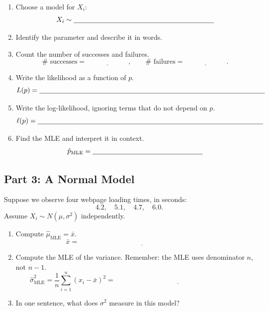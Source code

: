 \documentclass{article}
\newcommand{\blankline}[1]{\underline{\hspace{#1}}}
\begin{document}
\begin{enumerate}[label={\bfseries (\Alph*)},itemsep=.75em]
\item Choose a model for $X_i$:
\[
X_i \sim \blankline{2.8in}
\]
\item Identify the parameter and describe it in words. \\[3em]
\item Count the number of successes and failures.
\[
\#\text{ successes}=\blankline{1in}, \qquad \#\text{ failures}=\blankline{1in}.
\]
\item Write the likelihood as a function of $p$.
\[
L(p) = \blankline{4.5in}
\]
\item Write the log-likelihood, ignoring terms that do not depend on $p$.
\[
\ell(p) = \blankline{4.5in}
\]
\item Find the MLE and interpret it in context.
\[
\hat{p}_{\text{MLE}} = \blankline{2.2in}
\]
\vspace{2em}
\end{enumerate}

\subsection*{Part 3: A Normal Model}
Suppose we observe four webpage loading times, in seconds:
\[
4.2,\quad 5.1,\quad 4.7,\quad 6.0.
\]
Assume $X_i \sim N(\mu,\sigma^2)$ independently.

\begin{enumerate}[label={\bfseries (\Alph*)},itemsep=.75em]
\item Compute $\hat\mu_{\text{MLE}}=\bar{x}$.
\[
\bar{x}=\blankline{3in}
\]
\item Compute the MLE of the variance. Remember: the MLE uses denominator $n$, not $n-1$.
\[
\hat\sigma^2_{\text{MLE}} = \frac{1}{n}\sum_{i=1}^n (x_i-\bar{x})^2 = \blankline{3in}
\]
\item In one sentence, what does $\sigma^2$ measure in this model? \\[3em]
\end{enumerate}
\end{document}

